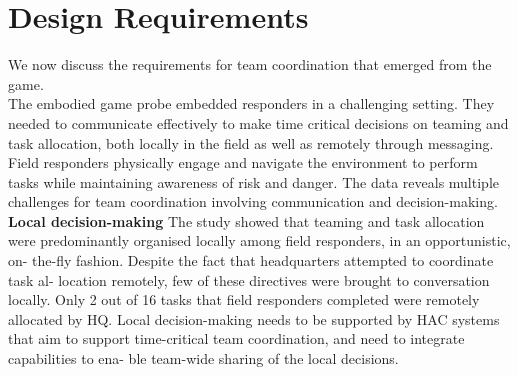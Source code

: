 


\section{Design Requirements}
We now discuss the requirements for team coordination that emerged from the game.\\

The embodied game probe embedded responders in a challenging setting. They needed to communicate effectively to make time critical decisions on teaming and task allocation, both locally in the field as well as remotely through messaging. Field responders physically engage and navigate the environment to perform tasks while maintaining awareness of risk and danger. The data reveals multiple challenges for team coordination involving communication and decision-making. \\

\textbf{Local decision-making} The study showed that teaming and task allocation were predominantly organised locally among field responders, in an opportunistic, on- the-fly fashion. Despite the fact that headquarters attempted to coordinate task al- location remotely, few of these directives were brought to conversation locally. Only 2 out of 16 tasks that field responders completed were remotely allocated by HQ. Local decision-making needs to be supported by HAC systems that aim to support time-critical team coordination, and need to integrate capabilities to ena- ble team-wide sharing of the local decisions.\\

